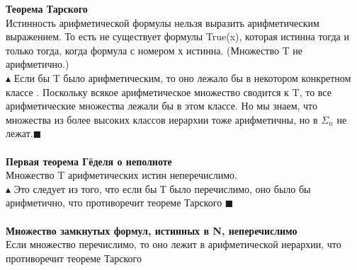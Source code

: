 \textbf{Теорема Тарского}\\
Истинность арифметической формулы нельзя выразить арифметическим выражением. То есть не существует формулы True(x), которая истинна тогда и только тогда, когда формула с номером х истинна. (Множество T не арифметично.)
\\
$\blacktriangle$ Если бы T было арифметическим, то оно лежало бы в некотором конкретном классе . Поскольку всякое арифметическое множество сводится к T, то все арифметические множества лежали бы в этом классе. Но мы знаем, что множества из более высоких классов иерархии тоже арифметичны, но в $\Sigma_n$ не лежат.$\blacksquare$
\\
\\
\textbf{ Первая теорема
Гёделя о неполноте}\\
Множество T арифметических истин неперечислимо.\\
$\blacktriangle$ Это следует из того, что если бы Т было перечислимо, оно было бы арифметично, что противоречит теореме Тарского $\blacksquare$ 
\\
\\
\textbf{Множество замкнутых формул, истинных в N, неперечислимо } \\
Если множество перечислимо, то оно лежит в арифметической иерархии, что противоречит теореме Тарского
